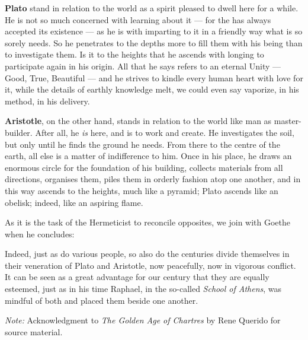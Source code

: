 \begin{quotex}
\textbf{Plato }stand in relation to the world as a spirit pleased to dwell here for a while. He is not so much concerned with learning about it — for the has always accepted its existence — as he is with imparting to it in a friendly way what is so sorely needs. So he penetrates to the depths more to fill them with his being than to investigate them. Is it to the heights that he ascends with longing to participate again in his origin. All that he says refers to an eternal Unity — Good, True, Beautiful — and he strives to kindle every human heart with love for it, while the details of earthly knowledge melt, we could even say vaporize, in his method, in his delivery.

\textbf{Aristotle}, on the other hand, stands in relation to the world like man as master-builder. After all, he \emph{is }here, and is to work and create. He investigates the soil, but only until he finds the ground he needs. From there to the centre of the earth, all else is a matter of indifference to him. Once in his place, he draws an enormous circle for the foundation of his building, collects materials from all directions, organises them, piles them in orderly fashion atop one another, and in this way ascends to the heights, much like a pyramid; Plato ascends like an obelisk; indeed, like an aspiring flame. 

\end{quotex}
As it is the task of the Hermeticist to reconcile opposites, we join with Goethe when he concludes:

\begin{quotex}
Indeed, just as do various people, so also do the centuries divide themselves in their veneration of Plato and Aristotle, now peacefully, now in vigorous conflict. It can be seen as a great advantage for our century that they are equally esteemed, just as in his time Raphael, in the so-called \emph{School of Athens}, was mindful of both and placed them beside one another. 

\end{quotex}
\textit{Note:} Acknowledgment to \textit{The Golden Age of Chartres} by Rene Querido for source material.

